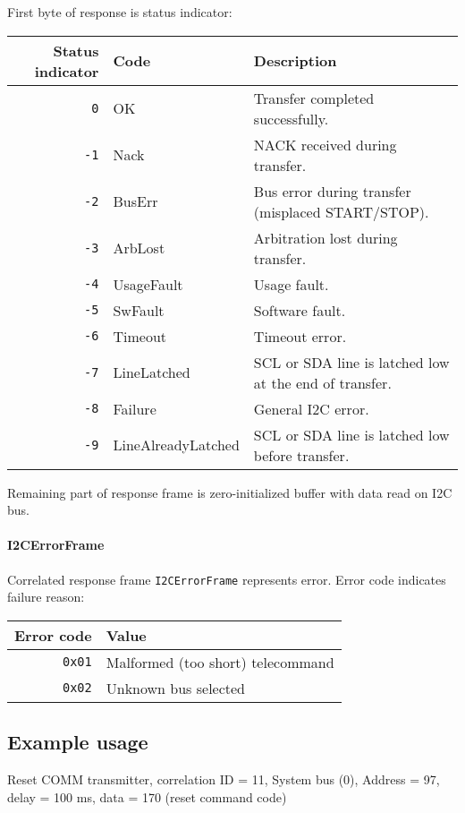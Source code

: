 First byte of response is status indicator:

\begin{tabular}{r | l | l}
	Status indicator & Code & Description \\
	\hline
	\texttt{0} & OK & Transfer completed successfully. \\
	\texttt{-1} & Nack & NACK received during transfer. \\
	\texttt{-2} & BusErr & Bus error during transfer (misplaced START/STOP). \\
	\texttt{-3} & ArbLost & Arbitration lost during transfer. \\
	\texttt{-4} & UsageFault & Usage fault. \\
	\texttt{-5} & SwFault & Software fault. \\
	\texttt{-6} & Timeout & Timeout error. \\
	\texttt{-7} & LineLatched & SCL or SDA line is latched low at the end of transfer. \\
	\texttt{-8} & Failure & General I2C error. \\
	\texttt{-9} & LineAlreadyLatched & SCL or SDA line is latched low before transfer. \\
\end{tabular}

Remaining part of response frame is zero-initialized buffer with data read on I2C bus. 

\paragraph{I2CErrorFrame}
Correlated response frame \texttt{I2CErrorFrame} represents error. Error code indicates failure reason:

\begin{tabular}{r | l}
	Error code & Value \\
	\hline
	\texttt{0x01} & Malformed (too short) telecommand \\
	\texttt{0x02} & Unknown bus selected \\
\end{tabular}

\subsection{Example usage}
Reset COMM transmitter, correlation ID = 11, System bus (0), Address = 97, delay = 100 ms, data = 170 (reset command code)
